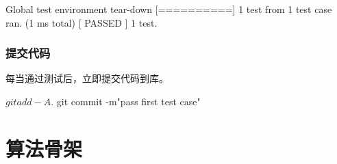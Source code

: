 \begin{content}
\begin{leftbar}
\begin{c++}[caption={\ttfamily{运行测试}}]
[----------] Global test environment tear-down
[==========] 1 test from 1 test case ran. (1 ms total)
[  PASSED  ] 1 test.
 \end{c++}
\end{leftbar}

\subsubsection{提交代码}

每当通过测试后，立即提交代码到库。

\begin{leftbar}
 \begin{c++}[caption={\ttfamily{提交代码}}]
$ git add -A .
$ git commit -m"pass first test case"
 \end{c++}
\end{leftbar}

\end{content}

\section{算法骨架}

